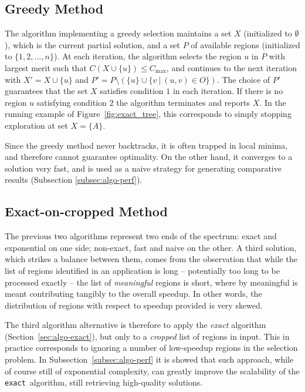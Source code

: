\documentclass[]{usiinfthesis}
\newcommand{\exact}{\texttt{exact}}
\begin{document}
\subsection{Greedy Method}

The algorithm implementing a greedy selection maintains a set $X$
(initialized to $\emptyset$), which is the current partial solution,
and a set $P$ of available regions (initialized to $\{ 1, 2, \ldots, n
\}$). At each iteration, the algorithm selects the region $u$ in $P$
with largest merit such that $C(X\cup \{u\})\le C_{\max}$, and
continues to the next iteration with $X' = X\cup \{u\}$ and $P' =
P\setminus (\{u\}\cup\{ v\ |\ (u,v)\in O \})$. The choice of $P'$
guarantees that the set $X$ satisfies condition $1$ in each
iteration. If there is no region $u$ satisfying condition $2$ the
algorithm terminates and reports $X$.  In the running example of
Figure~\ref{fig:exact_tree}, this corresponds to simply stopping
exploration at set $X=\{A\}$.

Since the greedy method never backtracks, it is often trapped in local
minima, and therefore cannot guarantee optimality. On the other hand,
it converges to a solution very fast, and is used as a naive strategy
for generating comparative results (Subsection \ref{subsec:algo-perf}).

\subsection{Exact-on-cropped Method}

The previous two algorithms represent two ends of the spectrum: exact
and exponential on one side; non-exact, fast and naive on the other.
A third solution, which strikes a balance between them, comes from the
observation that while the list of regions identified in an
application is long -- potentially too long to be processed exactly
-- the list of \emph{meaningful} regions is short, where by
meaningful is meant contributing tangibly to the overall speedup. In
other words, the distribution of regions with respect to speedup
provided is very skewed.

The third algorithm alternative is therefore to apply the \emph{exact}
algorithm (Section~\ref{sec:algo-exact}), but only to a \emph{cropped}
list of regions in input. This in practice corresponds to ignoring a
number of low-speedup regions in the selection problem. In
Subsection~\ref{subsec:algo-perf} it is showed that such approach, while of
course still of exponential complexity, can greatly improve the
scalability of the \exact\ algorithm, still retrieving high-quality
solutions.
\end{document}
